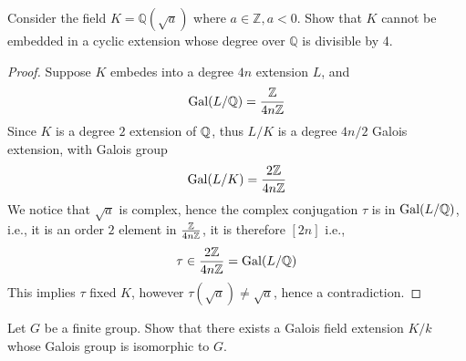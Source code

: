 \begin{prob}[S2009-Q3]
    Consider the field \(K = \mathbb{Q}(\sqrt{a})\) where \(a \in \mathbb{Z}, a < 0\). Show that \(K\) cannot be embedded in a cyclic extension whose degree over \(\mathbb{Q}\) is divisible by 4.
\end{prob}
\begin{proof}
    Suppose $K$ embedes into a degree $4n$ extension $L$, and 
    \begin{equation*}
        \text{Gal}(L/\mathbb{Q})=\frac{\mathbb{Z}}{4n\mathbb{Z}}
    \end{equation*} 
    Since $K$ is a degree $2$ extension of $\mathbb{Q}$, thus $L/K$ is a degree $4n/2$ Galois extension, with Galois group 
    \begin{equation*}
        \text{Gal}(L/K)=\frac{2\mathbb{Z}}{4n\mathbb{Z}}
    \end{equation*}
    We notice that $\sqrt{a}$ is complex, hence the complex conjugation $\tau$ is in $\text{Gal}(L/\mathbb{Q})$, i.e., it is an order $2$ element in $\frac{\mathbb{Z}}{4n\mathbb{Z}}$, it is therefore $[2n]$ i.e., 
    \begin{equation*}
        \tau\in\frac{2\mathbb{Z}}{4n\mathbb{Z}}=\text{Gal}(L/\mathbb{Q})
    \end{equation*}
    This implies $\tau$ fixed $K$, however $\tau(\sqrt{a})\neq\sqrt{a}$, hence a contradiction.
\end{proof}


\begin{prob}[F2000-Q4]
    Let \(G\) be a finite group. Show that there exists a Galois field extension \(K/k\) whose Galois group is isomorphic to \(G\).
\end{prob}


